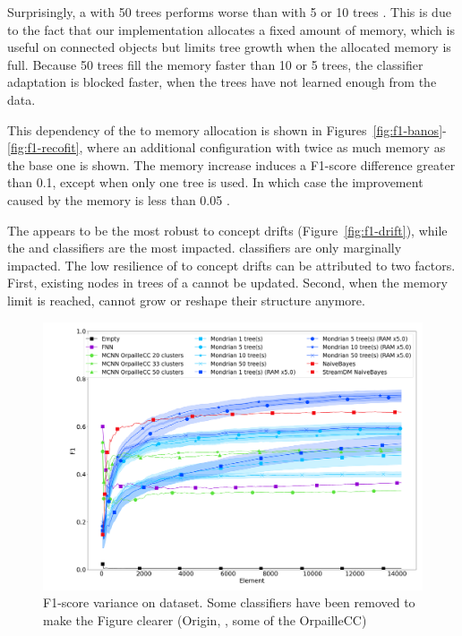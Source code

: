 Surprisingly, a \mondrianforest with 50 trees performs worse than with 5 or
10 trees . This is due to the fact that our
\mondrianforest implementation allocates a fixed amount of memory, which is
useful on connected objects but limits tree growth when the allocated
memory is full. Because 50 trees fill the memory faster than 10 or 5 trees,
the classifier adaptation is blocked faster, when the trees have not
learned enough from the data.

This dependency of the \mondrianforest to memory allocation is 
shown in Figures~\ref{fig:f1-banos}-\ref{fig:f1-recofit}, where 
an additional configuration with twice as much memory as the base one is shown.
The memory increase induces a F1-score difference greater than 0.1, except when only one tree
is used. In which case the improvement caused by the memory is less than 0.05 .

The \hoeffdingtree appears to be the most robust to concept drifts
(Figure~\ref{fig:f1-drift}), while the \mondrianforest and \naivebayes
classifiers are the most impacted. \mcnn classifiers are only marginally impacted.
The low resilience of \mondrianforest to concept drifts can be attributed to
two factors. First, existing nodes in trees of a \mondrianforest cannot be updated.
Second, when the memory limit is reached, \mondrianforest cannot grow
or reshape their structure anymore.

\begin{figure}
		\includegraphics[width=\linewidth]{figures/results/banos_6_f1_std.png}
		\caption{F1-score variance on \banosdataset dataset. Some classifiers
		have been removed to make the Figure clearer (\mcnn Origin,
		\hoeffdingtree, some of the \mcnn OrpailleCC)}
		\label{fig:f1-variance}
\end{figure}

